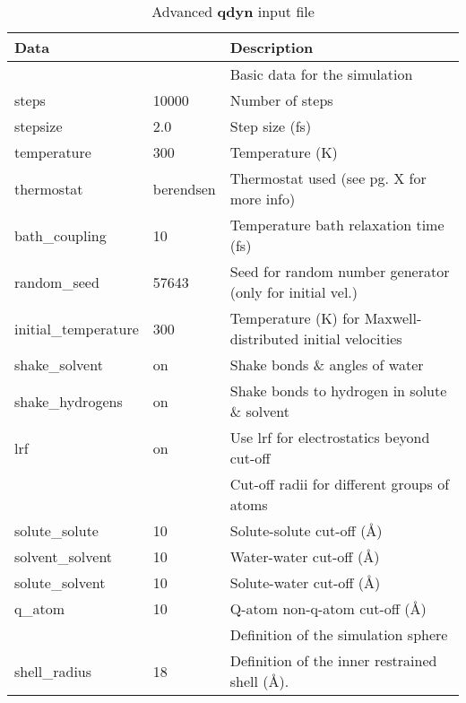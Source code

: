 \documentclass[a4paper,10pt]{article}
\begin{document}
\begin{longtable}{|p{105pt} p{60pt}|p{235pt}|}
\caption{Advanced \textbf{qdyn} input file} \\
  \hline \textbf{Data}            &              & \textbf{Description} \\
  \endhead
  \hline [MD]                     &              & Basic data for the simulation \\
  \hline steps                    & 10000        & Number of steps \\
  \hline stepsize                 & 2.0          & Step size (fs) \\
  \hline temperature              & 300          & Temperature (K) \\
  \hline thermostat               & berendsen    & Thermostat used (see pg. X for more info) \\
  \hline bath{\_}coupling         & 10           & Temperature bath relaxation time (fs) \\
  \hline random{\_}seed           & 57643        & Seed for random number generator (only for initial vel.) \\
  \hline initial{\_}temperature   & 300          & Temperature (K) for Maxwell-distributed initial velocities\\
  \hline shake{\_}solvent         & on           & Shake bonds \& angles of water \\
  \hline shake{\_}hydrogens       & on           & Shake bonds to hydrogen in solute \& solvent \\
  \hline lrf                      & on           & Use lrf for electrostatics beyond cut-off \\
  \hline [cut-offs]               &              & Cut-off radii for different groups of atoms \\
  \hline solute{\_}solute         & 10           & Solute-solute cut-off (\AA) \\
  \hline solvent{\_}solvent       & 10           & Water-water cut-off (\AA) \\
  \hline solute{\_}solvent        & 10           & Solute-water cut-off (\AA) \\
  \hline q{\_}atom                & 10           & Q-atom non-q-atom cut-off (\AA) \\
  \hline [sphere]                 &              & Definition of the simulation sphere \\
  \hline shell{\_}radius          & 18           & Definition of the inner restrained shell (\AA). \\

\end{longtable}
\end{document}
